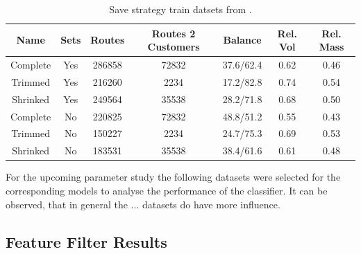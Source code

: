 \begin{table}[ht]
    \centering
    \begin{tabular}{c c c c c c c }
        \toprule
        Name     & Sets & Routes & Routes 2 Customers & Balance   & Rel. Vol & Rel. Mass \\
        \midrule
        Complete & Yes  & 286858 & 72832              & 37.6/62.4 & 0.62     & 0.46      \\
        Trimmed  & Yes  & 216260 & 2234               & 17.2/82.8 & 0.74     & 0.54      \\
        Shrinked & Yes  & 249564 & 35538              & 28.2/71.8 & 0.68     & 0.50      \\
        Complete & No   & 220825 & 72832              & 48.8/51.2 & 0.55     & 0.43      \\
        Trimmed  & No   & 150227 & 2234               & 24.7/75.3 & 0.69     & 0.53      \\
        Shrinked & No   & 183531 & 35538              & 38.4/61.6 & 0.61     & 0.48      \\

        \bottomrule
    \end{tabular}
    \caption[Save strategy train datsets from \gendreauDataSet.]{Save strategy train datsets from \gendreauDataSet.}
    \label{tab:saved_instances_gendreau}
\end{table}

For the upcoming parameter study the following datasets were selected for the corresponding models
to analyse the performance of the classifier. It can be observed, that in general the ... datasets
do have more influence.


\subsection{Feature Filter Results}
\label{sec:feature_filter_results}

